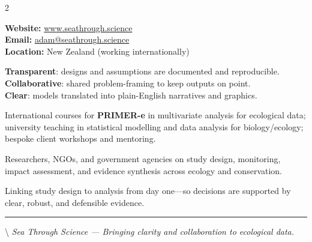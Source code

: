 \documentclass[
  11pt,
  letterpaper,
  DIV=11,
  numbers=noendperiod]{scrartcl}
\begin{document}
\begin{paracol}{2}
\begin{tcolorbox}[title=\textbf{Contact}]
\textbf{Website:} \href{https://www.seathrough.science}{www.seathrough.science}\\
\textbf{Email:} \href{mailto:adam@seathrough.science}{adam@seathrough.science}\\
\textbf{Location:} New Zealand (working internationally)
\end{tcolorbox}

\begin{tcolorbox}[title=\textbf{How I work}, colback=muted]
\textbf{Transparent}: designs and assumptions are documented and reproducible.\\
\textbf{Collaborative}: shared problem-framing to keep outputs on point.\\
\textbf{Clear}: models translated into plain-English narratives and graphics.
\end{tcolorbox}

\begin{tcolorbox}[title=\textbf{Teaching \& workshops}]
International courses for \textbf{PRIMER-e} in multivariate analysis for ecological data; university teaching in statistical modelling and data analysis for biology/ecology; bespoke client workshops and mentoring.
\end{tcolorbox}

\begin{tcolorbox}[title=\textbf{Recent collaborations}]
Researchers, NGOs, and government agencies on study design, monitoring, impact assessment, and evidence synthesis across ecology and conservation.
\end{tcolorbox}

\begin{tcolorbox}[title=\textbf{Value in a nutshell}, colback=muted]
Linking study design to analysis from day one—so decisions are supported by clear, robust, and defensible evidence.
\end{tcolorbox}

\end{paracol}

\vfill

\noindent

\textcolor{brand}{\rule{\linewidth}{0.6pt}}

\textbackslash{}
\textit{Sea Through Science — Bringing clarity and collaboration to ecological data.}
\end{document}
